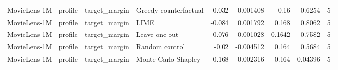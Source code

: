 \begin{table}[t]
{\begin{tabular}{llllrrrrr}
MovieLens-1M & profile & target\_margin & Greedy counterfactual & -0.032 & -0.001408 & 0.16 & 0.6254 & 5 \\
MovieLens-1M & profile & target\_margin & LIME & -0.084 & 0.001792 & 0.168 & 0.8062 & 5 \\
MovieLens-1M & profile & target\_margin & Leave-one-out & -0.076 & -0.001028 & 0.1642 & 0.7582 & 5 \\
MovieLens-1M & profile & target\_margin & Random control & -0.02 & -0.004512 & 0.164 & 0.5684 & 5 \\
MovieLens-1M & profile & target\_margin & Monte Carlo Shapley & 0.168 & 0.002316 & 0.164 & 0.04396 & 5 \\
\bottomrule
\end{tabular}
}
\end{table}
